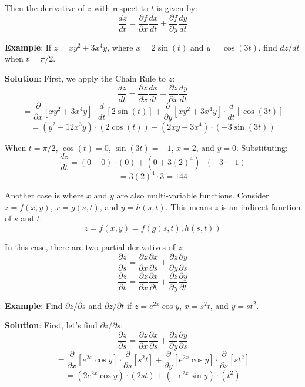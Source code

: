 Then the derivative of $z$ with respect to $t$ is given by:
$$\frac{dz}{dt} = \frac{\partial f}{\partial x} \frac{dx}{dt} + \frac{
\partial f}{\partial y} \frac{dy}{dt}$$

\textbf{Example}: If $z = xy^2 + 3x^4y$, where $x = 2\sin{\left( t \right)}$ 
and $y = \cos{ \left(3t \right)}$, find $dz/dt$ when $t = \pi/2$. 

\textbf{Solution}: First, we apply the Chain Rule to $z$:
$$\frac{dz}{dt} = \frac{\partial z}{\partial x} \frac{dx}{dt} + \frac{\partial 
z}{\partial x} \frac{dy}{dt}$$
$$= \frac{\partial}{\partial x} \left[ xy^2 + 3x^4y \right] \cdot \frac{d}{dt} 
\left[ 2\sin{ \left( t \right)} \right] + \frac{\partial}{\partial y} \left[ 
xy^2 + 3x^4y \right] \cdot \frac{d}{dt} \left[ \cos{ \left( 3t \right)} 
\right]$$
$$= \left( y^2 + 12x^3y \right) \cdot \left( 2\cos{ \left( t \right)} \right) 
+ \left( 2xy + 3x^4 \right) \cdot \left( -3\sin{ \left( 3t \right) } \right)$$

When $t = \pi/2$, $\cos{\left( t \right)} = 0$, $\sin{ \left( 3t \right)} = 
-1$, $x = 2$, and $y = 0$. Substituting:
$$\frac{dz}{dt} = \left( 0 + 0 \right) \cdot \left( 0 \right) + \left( 0 + 
3(2)^4 \right) \cdot \left( -3 \cdot -1 \right)$$
$$= 3(2)^4 \cdot 3 = 144$$

Another case is where $x$ and $y$ are also multi-variable functions. Consider 
$z = f(x, y)$, $x = g(s, t)$, and $y = h(s, t)$. This means $z$ is an indirect 
function of $s$ and $t$:
$$z = f(x, y) = f \left( g(s, t), h(s, t) \right)$$

In this case, there are two partial derivatives of $z$:
$$\frac{\partial z}{\partial s} = \frac{\partial z}{\partial x} \frac{\partial 
x}{\partial s} + \frac{\partial z}{\partial y} \frac{\partial y}{\partial s}$$
$$\frac{\partial z}{\partial t} = \frac{\partial z}{\partial x} \frac{\partial 
x}{\partial t} + \frac{\partial z}{\partial y} \frac{\partial y}{\partial t}$$

\textbf{Example}: Find $\partial z / \partial s$ and $\partial z / \partial t$ 
if $z = e^{2x} \cos{y}$, $x = s^2t$, and $y = st^2$. 

\textbf{Solution}: First, let's find $\partial z / \partial s$:
$$\frac{\partial z}{\partial s} = \frac{\partial z}{\partial x} \frac{\partial 
x}{\partial s} + \frac{\partial z}{\partial y} \frac{\partial y}{\partial s}$$
$$= \frac{\partial}{\partial x} \left[ e^{2x} \cos{y} \right] \cdot \frac{
\partial}{\partial s} \left[ s^2t \right] + \frac{\partial}{\partial y} \left[ 
e^{2x} \cos{y} \right] \cdot \frac{\partial}{\partial s} \left[ st^2 \right]$$
$$= \left( 2e^{2x}\cos{y} \right) \cdot \left(2st \right) + \left(-e^{2x}
\sin{y} \right) \cdot \left( t^2 \right)$$

